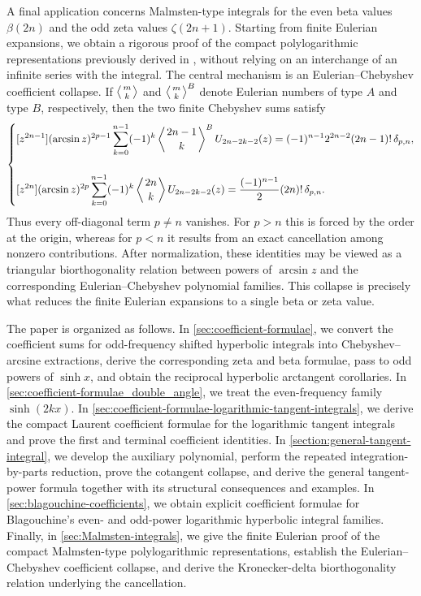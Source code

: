 \documentclass[11pt,twoside]{article}
\numberwithin{equation}{section}
\begin{document}
\vspace{0.1cm}

A final application concerns Malmsten-type integrals for the even beta values
$\beta(2n)$ and the odd zeta values $\zeta(2n+1)$.  Starting from finite
Eulerian expansions, we obtain a rigorous proof of the compact
polylogarithmic representations previously derived in
\cite{TallaWaffo2025arxiv2511.02843}, without relying on an interchange of an
infinite series with the integral.  The central mechanism is an
Eulerian--Chebyshev coefficient collapse.  If
$\left\langle {m\atop k}\right\rangle$ and
$\left\langle {m\atop k}\right\rangle^{B}$ denote Eulerian numbers of type
$A$ and type $B$, respectively, then the two finite Chebyshev sums satisfy
\[
\begin{dcases}
\displaystyle
[z^{2n-1}](\arcsin z)^{2p-1}
\sum_{k=0}^{n-1}(-1)^k
\left\langle {2n-1\atop k}\right\rangle^{B}
U_{2n-2k-2}(z)
=
(-1)^{n-1}2^{2n-2}(2n-1)!\,\delta_{p,n},
\\[3ex]
\displaystyle
[z^{2n}](\arcsin z)^{2p}
\sum_{k=0}^{n-1}(-1)^k
\left\langle {2n\atop k}\right\rangle
U_{2n-2k-2}(z)
=
\frac{(-1)^{n-1}}{2}(2n)!\,\delta_{p,n}.
\end{dcases}
\]
Thus every off-diagonal term $p\neq n$ vanishes.  For $p>n$ this is forced by
the order at the origin, whereas for $p<n$ it results from an exact
cancellation among nonzero contributions.  After normalization, these
identities may be viewed as a triangular biorthogonality relation between
powers of $\arcsin z$ and the corresponding Eulerian--Chebyshev polynomial
families.  This collapse is precisely what reduces the finite Eulerian
expansions to a single beta or zeta value.

\vspace{0.1cm}

The paper is organized as follows.  In \cref{sec:coefficient-formulae}, we
convert the coefficient sums for odd-frequency shifted hyperbolic integrals
into Chebyshev--arcsine extractions, derive the corresponding zeta and beta
formulae, pass to odd powers of \(\sinh x\), and obtain the reciprocal
hyperbolic arctangent corollaries.  In
\cref{sec:coefficient-formulae_double_angle}, we treat the even-frequency
family \(\sinh(2kx)\).  In
\cref{sec:coefficient-formulae-logarithmic-tangent-integrals}, we derive the
compact Laurent coefficient formulae for the logarithmic tangent integrals and
prove the first and terminal coefficient identities.  In
\cref{section:general-tangent-integral}, we develop the auxiliary polynomial,
perform the repeated integration-by-parts reduction, prove the cotangent
collapse, and derive the general tangent-power formula together with its
structural consequences and examples.  In
\cref{sec:blagouchine-coefficients}, we obtain explicit coefficient formulae
for Blagouchine's even- and odd-power logarithmic hyperbolic integral
families.  Finally, in \cref{sec:Malmsten-integrals}, we give the finite
Eulerian proof of the compact Malmsten-type polylogarithmic representations,
establish the Eulerian--Chebyshev coefficient collapse, and derive the
Kronecker-delta biorthogonality relation underlying the cancellation.
\end{document}
